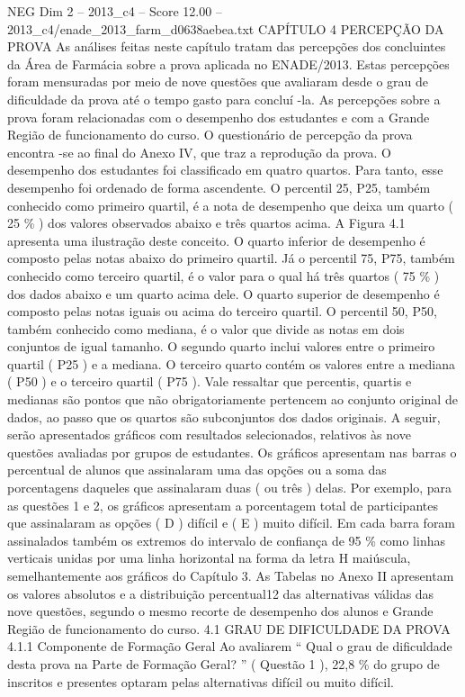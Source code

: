 \begin{textsample}{NEG Dim 2 – 2013\_c4 – Score 12.00 – 2013\_c4/enade\_2013\_farm\_d0638aebea.txt}  \label{ex:f2_neg_371}
CAPÍTULO 4 PERCEPÇÃO DA PROVA As análises feitas neste capítulo tratam das percepções dos concluintes da Área de Farmácia sobre a prova aplicada no ENADE/2013.
Estas percepções foram mensuradas por meio de nove questões que avaliaram desde o grau de dificuldade da prova até o tempo gasto para concluí -la.
As percepções sobre a prova foram relacionadas com o desempenho dos estudantes e com a Grande Região de funcionamento do curso.
O questionário de percepção da prova encontra -se ao final do Anexo IV, que traz a reprodução da prova.
O desempenho dos estudantes foi classificado em quatro quartos.
Para tanto, esse desempenho foi ordenado de forma ascendente.
O percentil 25, P25, também conhecido como primeiro quartil, é a nota de desempenho que deixa um quarto ( 25 \% ) dos valores observados abaixo e três quartos acima.
A Figura 4.1 apresenta uma ilustração deste conceito.
O quarto inferior de desempenho é composto pelas notas abaixo do primeiro quartil.
Já o percentil 75, P75, também conhecido como terceiro quartil, é o valor para o qual há três quartos ( 75 \% ) dos dados abaixo e um quarto acima dele.
O quarto superior de desempenho é composto pelas notas iguais ou acima do terceiro quartil.
O percentil 50, P50, também conhecido como mediana, é o valor que divide as notas em dois conjuntos de igual tamanho.
O segundo quarto inclui valores entre o primeiro quartil ( P25 ) e a mediana.
O terceiro quarto contém os valores entre a mediana ( P50 ) e o terceiro quartil ( P75 ).
Vale ressaltar que percentis, quartis e medianas são pontos que não obrigatoriamente pertencem ao conjunto original de dados, ao passo que os quartos são subconjuntos dos dados originais.
A seguir, serão apresentados gráficos com resultados selecionados, relativos às nove questões avaliadas por grupos de estudantes.
Os gráficos apresentam nas barras o percentual de alunos que assinalaram uma das opções ou a soma das porcentagens daqueles que assinalaram duas ( ou três ) delas.
Por exemplo, para as questões 1 e 2, os gráficos apresentam a porcentagem total de participantes que assinalaram as opções ( D ) difícil e ( E ) muito difícil.
Em cada barra foram assinalados também os extremos do intervalo de confiança de 95 \% como linhas verticais unidas por uma linha horizontal na forma da letra H maiúscula, semelhantemente aos gráficos do Capítulo 3.
As Tabelas no Anexo II apresentam os valores absolutos e a distribuição percentual12 das alternativas válidas das nove questões, segundo o mesmo recorte de desempenho dos alunos e Grande Região de funcionamento do curso. 4.1 GRAU DE DIFICULDADE DA PROVA 4.1.1 Componente de Formação Geral Ao avaliarem “ Qual o grau de dificuldade desta prova na Parte de Formação Geral? ” ( Questão 1 ), 22,8 \% do grupo de inscritos e presentes optaram pelas alternativas difícil ou muito difícil.

\end{textsample}
